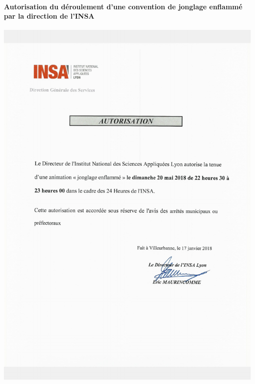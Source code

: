 \documentclass[hidelinks, paper=a4, fontsize=13pt]{report}
\begin{document}
\newpage

\paragraph{Autorisation du déroulement d’une convention de jonglage enflammé par la direction de l’INSA}

\begin{center}
\includegraphics[width=.8\textwidth,keepaspectratio]{Annexes/Documents/INSAAutorisationSpectacleDeFeu}
\end{center}

\end{document}
